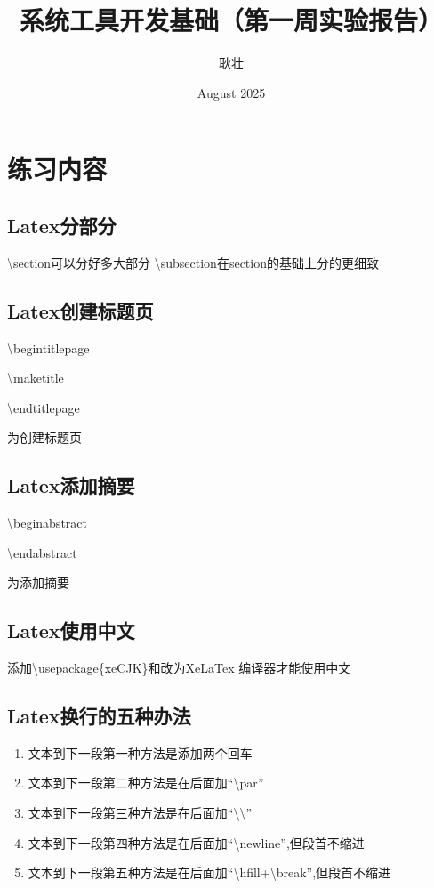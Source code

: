 \documentclass{article}
\title{\textbf{\huge 系统工具开发基础（第一周实验报告）}}
\author{\LARGE 耿壮}
\date{August 2025}
\begin{document}
\begin{titlepage}
\maketitle
\end{titlepage}
\section{\LARGE 练习内容}
\subsection{Latex分部分}
\textbackslash{section}可以分好多大部分
\textbackslash{subsection}在section的基础上分的更细致
\subsection{Latex创建标题页}
\begin{flushleft}
\textbackslash{begin{titlepage}}\par
\textbackslash{maketitle}\par
\textbackslash{end{titlepage}}\par
为创建标题页
\end{flushleft}
\subsection{Latex添加摘要}
\begin{flushleft}
\textbackslash{begin{abstract}}  \par
\textbackslash{end{abstract}}\par
为添加摘要
\end{flushleft}
\subsection{Latex使用中文}
添加\textbackslash{usepackage\{xeCJK\}}和改为XeLaTex 编译器才能使用中文
\subsection{Latex换行的五种办法}
\begin{enumerate}    
\item 文本到下一段第一种方法是添加两个回车\newline
\item 文本到下一段第二种方法是在后面加“\textbackslash{par}”\newline
\item 文本到下一段第三种方法是在后面加“\textbackslash\textbackslash”\newline
\item 文本到下一段第四种方法是在后面加“\textbackslash{newline}”,但段首不缩进\newline
\item 文本到下一段第五种方法是在后面加“\textbackslash{hfill}+\textbackslash{break}”,但段首不缩进
\end{enumerate}
\end{document}
